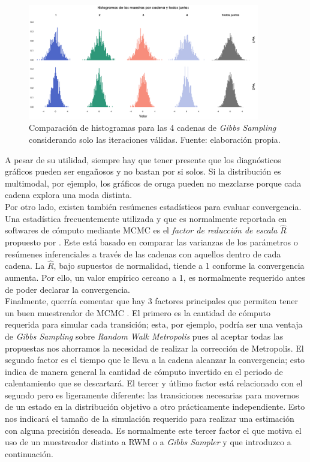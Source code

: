 \begin{figure}[h]
	\centering
	\includegraphics[width=0.9\textwidth]{Figs/Bayes/Ejemplos_Convergencia_Histogramas}
	\caption{Comparación de histogramas para las 4 cadenas de \textit{Gibbs Sampling} considerando solo las iteraciones válidas. Fuente: elaboración propia.}
	\label{fig:Conv_Hist}	
\end{figure}

A pesar de su utilidad, siempre hay que tener presente que los diagnósticos gráficos pueden ser engañosos y no bastan por si solos. Si la distribución es multimodal, por ejemplo, los gráficos de oruga pueden no mezclarse porque cada cadena explora una moda distinta.\\ 

Por otro lado, existen también resúmenes estadísticos para evaluar convergencia. Una estadística frecuentemente utilizada y que es normalmente reportada en softwares de cómputo mediante MCMC es el \textit{factor de reducción de escala} $\hat{R}$ propuesto por \textcite{GelmanRubin92}. Este está basado en comparar las varianzas de los parámetros o resúmenes inferenciales a través de las cadenas con aquellos dentro de cada cadena. La $\hat{R}$, bajo supuestos de normalidad, tiende a 1 conforme la convergencia aumenta. Por ello, un valor empírico cercano a 1, es normalmente requerido antes de poder declarar la convergencia.\\

Finalmente, querría comentar que hay 3 factores principales que permiten tener un buen muestreador de MCMC \parencite{Neal93}. El primero es la cantidad de cómputo requerida para simular cada transición; esta, por ejemplo, podría ser una ventaja de \textit{Gibbs Sampling} sobre \textit{Random Walk Metropolis} pues al aceptar todas las propuestas nos ahorramos la necesidad de realizar la corrección de Metropolis. El segundo factor es el tiempo que le lleva a la cadena alcanzar la convergencia; esto indica de manera general la cantidad de cómputo invertido en el periodo de calentamiento que se descartará. El tercer y útlimo factor está relacionado con el segundo pero es ligeramente diferente: las transiciones necesarias para movernos de un estado en la distribución objetivo a otro prácticamente independiente. Esto nos indicará el tamaño de la simulación requerido para realizar una estimación con alguna precisión deseada. Es normalmente este tercer factor el que motiva el uso de un muestreador distinto a RWM o a \textit{Gibbs Sampler} y que introduzco a continuación.\label{factor_ventaja_HMC}

